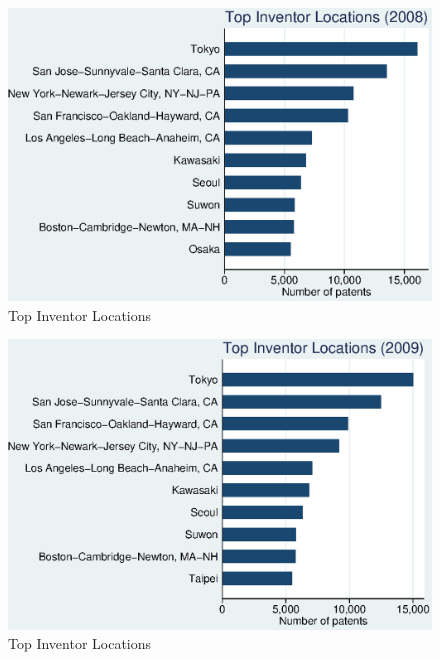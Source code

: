 \documentclass[12pt]{article}
\begin{document}
\begin{figure}[h]
\begin{centering}
  \includegraphics{2008top10}
  \caption{Top Inventor Locations}
  \label{fig:2008top10}
\end{centering}
\end{figure}

\begin{figure}[h]
\begin{centering}
  \includegraphics{2009top10}
  \caption{Top Inventor Locations}
  \label{fig:2009top10}
\end{centering}
\end{figure}
\end{document}
